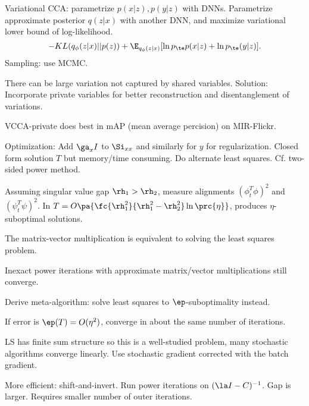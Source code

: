 Variational CCA: parametrize $p(x|z),p(y|z)$ with DNNs. Parametrize approximate posterior $q(z|x)$ with another DNN, and maximize variational lower bound of log-likelihood. 
$$-KL(q_\phi(z|x)||p(z)) + \E_{q_\phi(z|x)} [\ln p_\te p(x|z) + \ln p_\te(y|z)].$$
Sampling: use MCMC.

There can be large variation not captured by shared variables. Solution: 
Incorporate private variables for better reconstruction and disentanglement of variations.

VCCA-private does best in mAP (mean average percision) on MIR-Flickr.

Optimization: Add $\ga_xI$ to $\Si_{xx}$ and similarly for $y$ for regularization. Closed form solution $T$ but memory/time consuming.
Do alternate least squares. Cf. two-sided power method.

Assuming singular value gap $\rh_1>\rh_2$, measure alignments $(\phi_t^T \phi)^2$ and $(\psi_t^T\psi)^2$. In $T=O\pa{\fc{\rh_1^2}{\rh_1^2-\rh_2^2}\ln \prc{\eta}}$, produces $\eta$-suboptimal solutions.

The matrix-vector multiplication is equivalent to solving the least squares problem.

Inexact power iterations with approximate matrix/vector multiplications still converge. 

Derive meta-algorithm: solve least squares to $\ep$-suboptimality instead. 

If error is $\ep(T)=O(\eta^2)$, converge in about the same number of iterations.

LS has finite sum structure so this is a well-studied problem, many stochastic algorithms converge linearly. Use stochastic gradient corrected with the batch gradient.

More efficient: shift-and-invert.  Run power iterations on $(\la I - C)^{-1}$. Gap is larger. Requires smaller number of outer iterations.

